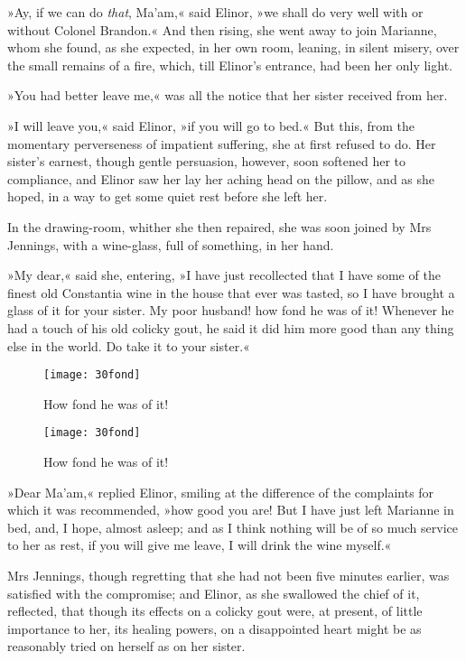 »Ay, if we can do \textit{that}, Ma’am,« said Elinor, »we shall do very well with or without Colonel Brandon.« And then rising, she went away to join Marianne, whom she found, as she expected, in her own room, leaning, in silent misery, over the small remains of a fire, which, till Elinor’s entrance, had been her only light.

»You had better leave me,« was all the notice that her sister received from her.

»I will leave you,« said Elinor, »if you will go to bed.« But this, from the momentary perverseness of impatient suffering, she at first refused to do. Her sister’s earnest, though gentle persuasion, however, soon softened her to compliance, and Elinor saw her lay her aching head on the pillow, and as she hoped, in a way to get some quiet rest before she left her.

In the drawing-room, whither she then repaired, she was soon joined by Mrs Jennings, with a wine-glass, full of something, in her hand.

»My dear,« said she, entering, »I have just recollected that I have some of the finest old Constantia wine in the house that ever was tasted, so I have brought a glass of it for your sister. My poor husband! how fond he was of it! Whenever he had a touch of his old colicky gout, he said it did him more good than any thing else in the world. Do take it to your sister.«


\makeatletter
{}
{%
	\begin{figure}[tbph]
	\centering
	\texttt{[image: 30fond]}
	\caption{How fond he was of it!}
	\end{figure}
}{%
	\begin{figure}[tbph]
	\centering
	\texttt{[image: 30fond]}
	\caption{How fond he was of it!}
	\end{figure}
}
\makeatother



»Dear Ma’am,« replied Elinor, smiling at the difference of the complaints for which it was recommended, »how good you are! But I have just left Marianne in bed, and, I hope, almost asleep; and as I think nothing will be of so much service to her as rest, if you will give me leave, I will drink the wine myself.«

Mrs Jennings, though regretting that she had not been five minutes earlier, was satisfied with the compromise; and Elinor, as she swallowed the chief of it, reflected, that though its effects on a colicky gout were, at present, of little importance to her, its healing powers, on a disappointed heart might be as reasonably tried on herself as on her sister.

